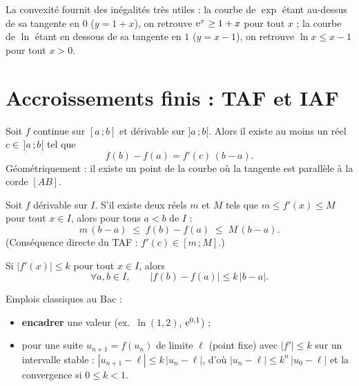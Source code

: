 \begin{astucebac}
	La convexité fournit des inégalités très utiles : la courbe de $\exp$ étant
	au-dessus de sa tangente en $0$ ($y=1+x$), on retrouve
	$\mathrm{e}^{x}\geq 1+x$ pour tout $x$ ; la courbe de $\ln$ étant en dessous de sa
	tangente en $1$ ($y=x-1$), on retrouve $\ln x\leq x-1$ pour tout $x>0$.
\end{astucebac}


\section{Accroissements finis : TAF et IAF}

\begin{theoreme}
	Soit $f$ continue sur $[a\,;b]$ et dérivable sur $]a\,;b[$. Alors il existe
	au moins un réel $c\in\,]a\,;b[$ tel que
	\[
	f(b)-f(a)=f'(c)\,(b-a).
	\]
	Géométriquement : il existe un point de la courbe où la tangente est
	parallèle à la corde $[AB]$.
\end{theoreme}

\begin{theoreme}
	Soit $f$ dérivable sur $I$. S'il existe deux réels $m$ et $M$ tels que
	$m\leq f'(x)\leq M$ pour tout $x\in I$, alors pour tous $a<b$ de $I$ :
	\[
	m\,(b-a)\;\leq\; f(b)-f(a)\;\leq\; M\,(b-a).
	\]
	(Conséquence directe du TAF : $f'(c)\in[m\,;M]$.)
\end{theoreme}

\begin{theoreme}
	Si $|f'(x)|\leq k$ pour tout $x\in I$, alors
	\[
	\forall a,b\in I,\qquad \bigl|f(b)-f(a)\bigr|\leq k\,|b-a|.
	\]
\end{theoreme}

\begin{astucebac}
	Emplois classiques au Bac :
	\begin{itemize}[label=\textbullet]
		\item \textbf{encadrer} une valeur (ex.\ $\ln(1{,}2)$, $\mathrm{e}^{0{,}1}$) ;
		\item pour une suite $u_{n+1}=f(u_n)$ de limite $\ell$ (point fixe) avec
		$|f'|\leq k$ sur un intervalle stable : $|u_{n+1}-\ell|\leq k\,|u_n-\ell|$,
		d'où $|u_n-\ell|\leq k^{n}\,|u_0-\ell|$ et la convergence si $0\leq k<1$.
	\end{itemize}
\end{astucebac}

